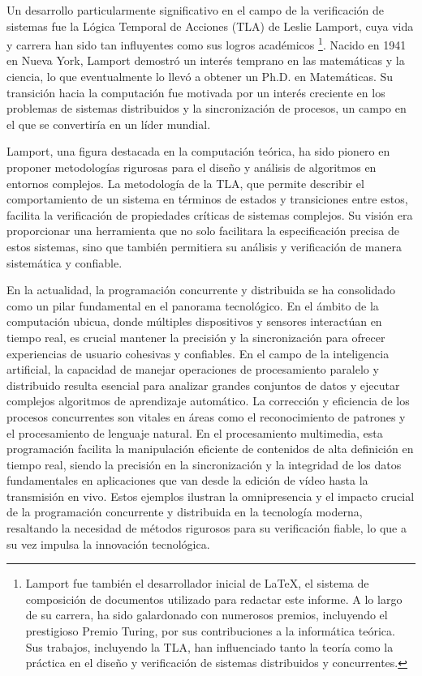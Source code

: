 Un desarrollo particularmente significativo en el campo de la verificación de sistemas fue la Lógica Temporal de Acciones (TLA) de Leslie Lamport, cuya vida y carrera han sido tan influyentes como sus logros académicos \footnote{Lamport fue también el desarrollador inicial de \LaTeX, el sistema de composición de documentos utilizado para redactar este informe. A lo largo de su carrera, ha sido galardonado con numerosos premios, incluyendo el prestigioso Premio Turing, por sus contribuciones a la informática teórica. Sus trabajos, incluyendo la TLA, han influenciado tanto la teoría como la práctica en el diseño y verificación de sistemas distribuidos y concurrentes.}. Nacido en 1941 en Nueva York, Lamport demostró un interés temprano en las matemáticas y la ciencia, lo que eventualmente lo llevó a obtener un Ph.D. en Matemáticas. Su transición hacia la computación fue motivada por un interés creciente en los problemas de sistemas distribuidos y la sincronización de procesos, un campo en el que se convertiría en un líder mundial.


Lamport, una figura destacada en la computación teórica, ha sido pionero en proponer metodologías rigurosas para el diseño y análisis de algoritmos en entornos complejos. La metodología de la TLA, que permite describir el comportamiento de un sistema en términos de estados y transiciones entre estos, facilita la verificación de propiedades críticas de sistemas complejos. Su visión era proporcionar una herramienta que no solo facilitara la especificación precisa de estos sistemas, sino que también permitiera su análisis y verificación de manera sistemática y confiable.


En la actualidad, la programación concurrente y distribuida se ha consolidado como un pilar fundamental en el panorama tecnológico. En el ámbito de la computación ubicua, donde múltiples dispositivos y sensores interactúan en tiempo real, es crucial mantener la precisión y la sincronización para ofrecer experiencias de usuario cohesivas y confiables. En el campo de la inteligencia artificial, la capacidad de manejar operaciones de procesamiento paralelo y distribuido resulta esencial para analizar grandes conjuntos de datos y ejecutar complejos algoritmos de aprendizaje automático. La corrección y eficiencia de los procesos concurrentes son vitales en áreas como el reconocimiento de patrones y el procesamiento de lenguaje natural. En el procesamiento multimedia, esta programación facilita la manipulación eficiente de contenidos de alta definición en tiempo real, siendo la precisión en la sincronización y la integridad de los datos fundamentales en aplicaciones que van desde la edición de vídeo hasta la transmisión en vivo. Estos ejemplos ilustran la omnipresencia y el impacto crucial de la programación concurrente y distribuida en la tecnología moderna, resaltando la necesidad de métodos rigurosos para su verificación fiable, lo que a su vez impulsa la innovación tecnológica.